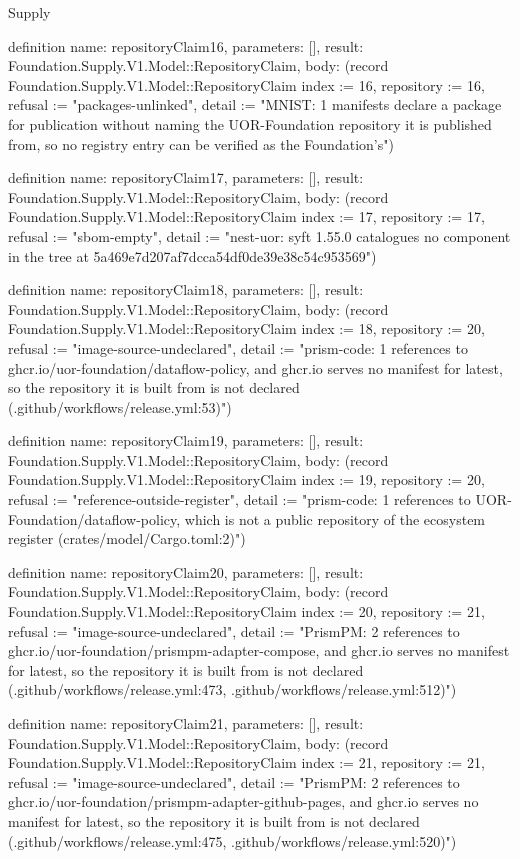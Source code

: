\begin{lexlean}{Supply}
\begin{semanticmodule}
definition{
  name: repositoryClaim16,
  parameters: [],
  result: Foundation.Supply.V1.Model::RepositoryClaim,
  body: (record Foundation.Supply.V1.Model::RepositoryClaim {index := 16, repository := 16, refusal := "packages-unlinked", detail := "MNIST: 1 manifests declare a package for publication without naming the UOR-Foundation repository it is published from, so no registry entry can be verified as the Foundation's"})
}

definition{
  name: repositoryClaim17,
  parameters: [],
  result: Foundation.Supply.V1.Model::RepositoryClaim,
  body: (record Foundation.Supply.V1.Model::RepositoryClaim {index := 17, repository := 17, refusal := "sbom-empty", detail := "nest-uor: syft 1.55.0 catalogues no component in the tree at 5a469e7d207af7dcca54df0de39e38c54c953569"})
}

definition{
  name: repositoryClaim18,
  parameters: [],
  result: Foundation.Supply.V1.Model::RepositoryClaim,
  body: (record Foundation.Supply.V1.Model::RepositoryClaim {index := 18, repository := 20, refusal := "image-source-undeclared", detail := "prism-code: 1 references to ghcr.io/uor-foundation/dataflow-policy, and ghcr.io serves no manifest for latest, so the repository it is built from is not declared (.github/workflows/release.yml:53)"})
}

definition{
  name: repositoryClaim19,
  parameters: [],
  result: Foundation.Supply.V1.Model::RepositoryClaim,
  body: (record Foundation.Supply.V1.Model::RepositoryClaim {index := 19, repository := 20, refusal := "reference-outside-register", detail := "prism-code: 1 references to UOR-Foundation/dataflow-policy, which is not a public repository of the ecosystem register (crates/model/Cargo.toml:2)"})
}

definition{
  name: repositoryClaim20,
  parameters: [],
  result: Foundation.Supply.V1.Model::RepositoryClaim,
  body: (record Foundation.Supply.V1.Model::RepositoryClaim {index := 20, repository := 21, refusal := "image-source-undeclared", detail := "PrismPM: 2 references to ghcr.io/uor-foundation/prismpm-adapter-compose, and ghcr.io serves no manifest for latest, so the repository it is built from is not declared (.github/workflows/release.yml:473, .github/workflows/release.yml:512)"})
}

definition{
  name: repositoryClaim21,
  parameters: [],
  result: Foundation.Supply.V1.Model::RepositoryClaim,
  body: (record Foundation.Supply.V1.Model::RepositoryClaim {index := 21, repository := 21, refusal := "image-source-undeclared", detail := "PrismPM: 2 references to ghcr.io/uor-foundation/prismpm-adapter-github-pages, and ghcr.io serves no manifest for latest, so the repository it is built from is not declared (.github/workflows/release.yml:475, .github/workflows/release.yml:520)"})
}


\end{semanticmodule}
\end{lexlean}
